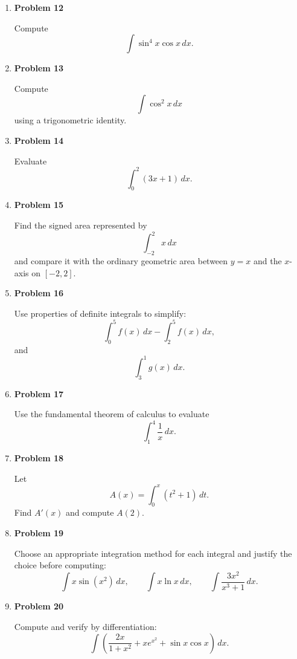 \begin{enumerate}
\item \textbf{Problem 12}\par
Compute
\[
\int \sin^4 x\cos x\,dx.
\]

\item \textbf{Problem 13}\par
Compute
\[
\int \cos^2 x\,dx
\]
using a trigonometric identity.

\item \textbf{Problem 14}\par
Evaluate
\[
\int_0^2 (3x+1)\,dx.
\]

\item \textbf{Problem 15}\par
Find the signed area represented by
\[
\int_{-2}^{2}x\,dx
\]
and compare it with the ordinary geometric area between \(y=x\) and the \(x\)-axis on \([-2,2]\).

\item \textbf{Problem 16}\par
Use properties of definite integrals to simplify:
\[
\int_0^5 f(x)\,dx-\int_2^5 f(x)\,dx,
\]
and
\[
\int_3^1 g(x)\,dx.
\]

\item \textbf{Problem 17}\par
Use the fundamental theorem of calculus to evaluate
\[
\int_1^4 \frac{1}{x}\,dx.
\]

\item \textbf{Problem 18}\par
Let
\[
A(x)=\int_0^x (t^2+1)\,dt.
\]
Find \(A'(x)\) and compute \(A(2)\).

\item \textbf{Problem 19}\par
Choose an appropriate integration method for each integral and justify the choice before computing:
\[
\int x\sin(x^2)\,dx,
\qquad
\int x\ln x\,dx,
\qquad
\int \frac{3x^2}{x^3+1}\,dx.
\]

\item \textbf{Problem 20}\par
Compute and verify by differentiation:
\[
\int \left(
\frac{2x}{1+x^2}
+x e^{x^2}
+\sin x\cos x
\right)\,dx.
\]
\end{enumerate}
